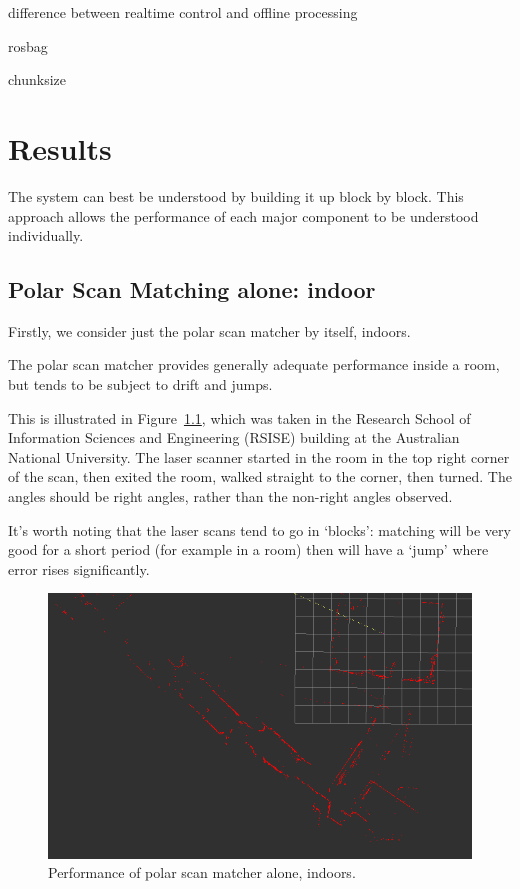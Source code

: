 \documentclass[12pt,oneside,a4paper]{book}
\begin{document}
difference between realtime control and offline processing

rosbag

chunksize

\chapter{Results}
\label{cha:results}

The system can best be understood by building it up block by
block. This approach allows the performance of each major component to
be understood individually.

\section{Polar Scan Matching alone: indoor}
\label{sec:psm-indoor}

Firstly, we consider just the polar scan matcher by itself, indoors.

The polar scan matcher provides generally adequate performance inside
a room, but tends to be subject to drift and jumps. 

This is illustrated in Figure~\ref{fig:psm-indoors}, which was taken
in the Research School of Information Sciences and Engineering (RSISE)
building at the Australian National University. The laser scanner
started in the room in the top right corner of the scan, then exited
the room, walked straight to the corner, then turned. The angles
should be right angles, rather than the non-right angles observed.

It's worth noting that the laser scans tend to go in `blocks':
matching will be very good for a short period (for example in a room)
then will have a `jump' where error rises significantly.

\begin{figure}[h!]
  \centering
  \includegraphics[width=\textwidth]{figs/indoor}
  \caption{Performance of polar scan matcher alone, indoors.}
  \label{fig:psm-indoors}
\end{figure}
\end{document}
